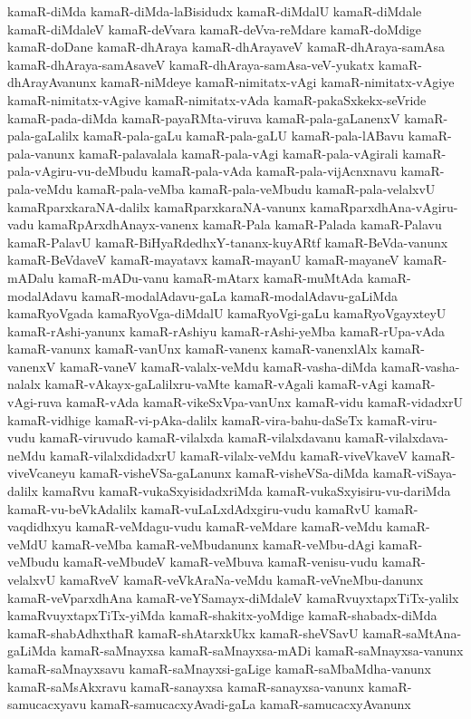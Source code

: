 {kamaR-diMda
kamaR-diMda-laBisidudx
kamaR-diMdalU
kamaR-diMdale
kamaR-diMdaleV
kamaR-deVvara
kamaR-deVva-reMdare
kamaR-doMdige
kamaR-doDane
kamaR-dhAraya
kamaR-dhArayaveV
kamaR-dhAraya-samAsa
kamaR-dhAraya-samAsaveV
kamaR-dhAraya-samAsa-veV-yukatx
kamaR-dhArayAvanunx
kamaR-niMdeye
kamaR-nimitatx-vAgi
kamaR-nimitatx-vAgiye
kamaR-nimitatx-vAgive
kamaR-nimitatx-vAda
kamaR-pakaSxkekx-seVride
kamaR-pada-diMda
kamaR-payaRMta-viruva
kamaR-pala-gaLanenxV
kamaR-pala-gaLalilx
kamaR-pala-gaLu
kamaR-pala-gaLU
kamaR-pala-lABavu
kamaR-pala-vanunx
kamaR-palavalala
kamaR-pala-vAgi
kamaR-pala-vAgirali
kamaR-pala-vAgiru-vu-deMbudu
kamaR-pala-vAda
kamaR-pala-vijAcnxnavu
kamaR-pala-veMdu
kamaR-pala-veMba
kamaR-pala-veMbudu
kamaR-pala-velalxvU
kamaRparxkaraNA-dalilx
kamaRparxkaraNA-vanunx
kamaRparxdhAna-vAgiru-vadu
kamaRpArxdhAnayx-vanenx
kamaR-Pala
kamaR-Palada
kamaR-Palavu
kamaR-PalavU
kamaR-BiHyaRdedhxY-tananx-kuyARtf
kamaR-BeVda-vanunx
kamaR-BeVdaveV
kamaR-mayatavx
kamaR-mayanU
kamaR-mayaneV
kamaR-mADalu
kamaR-mADu-vanu
kamaR-mAtarx
kamaR-muMtAda
kamaR-modalAdavu
kamaR-modalAdavu-gaLa
kamaR-modalAdavu-gaLiMda
kamaRyoVgada
kamaRyoVga-diMdalU
kamaRyoVgi-gaLu
kamaRyoVgayxteyU
kamaR-rAshi-yanunx
kamaR-rAshiyu
kamaR-rAshi-yeMba
kamaR-rUpa-vAda
kamaR-vanunx
kamaR-vanUnx
kamaR-vanenx
kamaR-vanenxlAlx
kamaR-vanenxV
kamaR-vaneV
kamaR-valalx-veMdu
kamaR-vasha-diMda
kamaR-vasha-nalalx
kamaR-vAkayx-gaLalilxru-vaMte
kamaR-vAgali
kamaR-vAgi
kamaR-vAgi-ruva
kamaR-vAda
kamaR-vikeSxVpa-vanUnx
kamaR-vidu
kamaR-vidadxrU
kamaR-vidhige
kamaR-vi-pAka-dalilx
kamaR-vira-bahu-daSeTx
kamaR-viru-vudu
kamaR-viruvudo
kamaR-vilalxda
kamaR-vilalxdavanu
kamaR-vilalxdava-neMdu
kamaR-vilalxdidadxrU
kamaR-vilalx-veMdu
kamaR-viveVkaveV
kamaR-viveVcaneyu
kamaR-visheVSa-gaLanunx
kamaR-visheVSa-diMda
kamaR-viSaya-dalilx
kamaRvu
kamaR-vukaSxyisidadxriMda
kamaR-vukaSxyisiru-vu-dariMda
kamaR-vu-beVkAdalilx
kamaR-vuLaLxdAdxgiru-vudu
kamaRvU
kamaR-vaqdidhxyu
kamaR-veMdagu-vudu
kamaR-veMdare
kamaR-veMdu
kamaR-veMdU
kamaR-veMba
kamaR-veMbudanunx
kamaR-veMbu-dAgi
kamaR-veMbudu
kamaR-veMbudeV
kamaR-veMbuva
kamaR-venisu-vudu
kamaR-velalxvU
kamaRveV
kamaR-veVkAraNa-veMdu
kamaR-veVneMbu-danunx
kamaR-veVparxdhAna
kamaR-veYSamayx-diMdaleV
kamaRvuyxtapxTiTx-yalilx
kamaRvuyxtapxTiTx-yiMda
kamaR-shakitx-yoMdige
kamaR-shabadx-diMda
kamaR-shabAdhxthaR
kamaR-shAtarxkUkx
kamaR-sheVSavU
kamaR-saMtAna-gaLiMda
kamaR-saMnayxsa
kamaR-saMnayxsa-mADi
kamaR-saMnayxsa-vanunx
kamaR-saMnayxsavu
kamaR-saMnayxsi-gaLige
kamaR-saMbaMdha-vanunx
kamaR-saMsAkxravu
kamaR-sanayxsa
kamaR-sanayxsa-vanunx
kamaR-samucacxyavu
kamaR-samucacxyAvadi-gaLa
kamaR-samucacxyAvanunx
}
